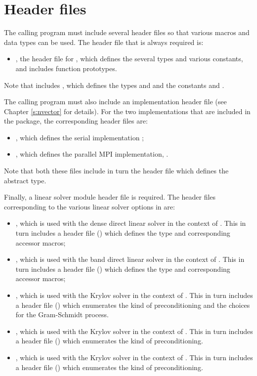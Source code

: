 \section{Header files}\label{ss:header_sim}
The calling program must include several header files so that various macros
and data types can be used. The header file that is always required is:
\begin{itemize}
\item  {}, 
  the header file for {\ida}, which defines the several
  types and various constants, and includes function prototypes.
\end{itemize}
Note that  includes , 
which defines the types  and 
and the constants  and .

The calling program must also include an {\nvector} implementation header file
(see Chapter \ref{s:nvector} for details).
For the two {\nvector} implementations that are included in the {\ida} package,
the corresponding header files are:
\begin{itemize}
\item {}, 
  which defines the serial implementation {\nvecs};
\item {}, 
  which defines the parallel MPI implementation, {\nvecp}.
\end{itemize}
Note that both these files include in turn the header file  which 
defines the abstract  type. 

Finally, a linear solver module header file is required. 
The header files corresponding to the various linear solver options in {\ida} are:
\begin{itemize}
\item {}, 
  which is used with the dense direct linear solver in 
  the context of {\ida}. This in turn includes a header file ()
  which defines the  type and corresponding accessor macros; 
\item {}, 
  which is used with the band direct linear solver in the
  context of {\ida}. This in turn includes a header file ()
  which defines the  type and corresponding accessor macros;
\item {}, 
  which is used with the Krylov solver {\spgmr} in the
  context of {\ida}. This in turn includes a header file ()
  which enumerates the kind of preconditioning and the choices for the
  Gram-Schmidt process.
\item {}, 
  which is used with the Krylov solver {\spbcg} in the
  context of {\ida}. This in turn includes a header file ()
  which enumerates the kind of preconditioning.
\item {}, 
  which is used with the Krylov solver {\sptfqmr} in the
  context of {\ida}. This in turn includes a header file ()
  which enumerates the kind of preconditioning.
\end{itemize}

